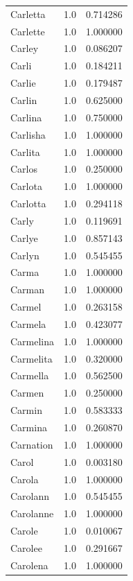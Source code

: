 \documentclass[
  letterpaper,
  DIV=11,
  numbers=noendperiod]{scrreprt}
\begin{document}
\begin{tabular}{lrr}
Carletta        &   1.0 &   0.714286 \\
Carlette        &   1.0 &   1.000000 \\
Carley          &   1.0 &   0.086207 \\
Carli           &   1.0 &   0.184211 \\
Carlie          &   1.0 &   0.179487 \\
Carlin          &   1.0 &   0.625000 \\
Carlina         &   1.0 &   0.750000 \\
Carlisha        &   1.0 &   1.000000 \\
Carlita         &   1.0 &   1.000000 \\
Carlos          &   1.0 &   0.250000 \\
Carlota         &   1.0 &   1.000000 \\
Carlotta        &   1.0 &   0.294118 \\
Carly           &   1.0 &   0.119691 \\
Carlye          &   1.0 &   0.857143 \\
Carlyn          &   1.0 &   0.545455 \\
Carma           &   1.0 &   1.000000 \\
Carman          &   1.0 &   1.000000 \\
Carmel          &   1.0 &   0.263158 \\
Carmela         &   1.0 &   0.423077 \\
Carmelina       &   1.0 &   1.000000 \\
Carmelita       &   1.0 &   0.320000 \\
Carmella        &   1.0 &   0.562500 \\
Carmen          &   1.0 &   0.250000 \\
Carmin          &   1.0 &   0.583333 \\
Carmina         &   1.0 &   0.260870 \\
Carnation       &   1.0 &   1.000000 \\
Carol           &   1.0 &   0.003180 \\
Carola          &   1.0 &   1.000000 \\
Carolann        &   1.0 &   0.545455 \\
Carolanne       &   1.0 &   1.000000 \\
Carole          &   1.0 &   0.010067 \\
Carolee         &   1.0 &   0.291667 \\
Carolena        &   1.0 &   1.000000 \\

\end{tabular}
\end{document}
